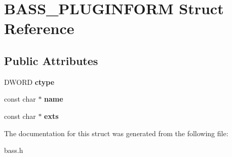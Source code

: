 \hypertarget{structBASS__PLUGINFORM}{}\section{B\+A\+S\+S\+\_\+\+P\+L\+U\+G\+I\+N\+F\+O\+R\+M Struct Reference}
\label{structBASS__PLUGINFORM}
\subsection*{Public Attributes}
\begin{DoxyCompactItemize}
\item 
\hypertarget{structBASS__PLUGINFORM_a93952bbca5695ff5c9e1bdc8e7271368}{}D\+W\+O\+R\+D {\bfseries ctype}\label{structBASS__PLUGINFORM_a93952bbca5695ff5c9e1bdc8e7271368}

\item 
\hypertarget{structBASS__PLUGINFORM_a5df5726f10e49ea23065f691e0c4f5a4}{}const char $\ast$ {\bfseries name}\label{structBASS__PLUGINFORM_a5df5726f10e49ea23065f691e0c4f5a4}

\item 
\hypertarget{structBASS__PLUGINFORM_a9aee80c1e2aa288d9e82ce5886c6a022}{}const char $\ast$ {\bfseries exts}\label{structBASS__PLUGINFORM_a9aee80c1e2aa288d9e82ce5886c6a022}

\end{DoxyCompactItemize}


The documentation for this struct was generated from the following file\+:\begin{DoxyCompactItemize}
\item 
bass.\+h\end{DoxyCompactItemize}
